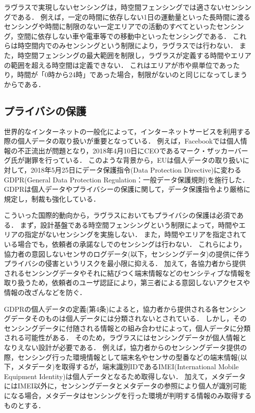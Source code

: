 ラヴラスで実現しないセンシングは，時空間フェンシングでは適さないセンシングである．
例えば，一定の時間に依存しない1日の運動量といった長時間に渡るセンシングや時間に制限のない一定エリアでの活動のすべてといったセンシング，空間に依存しない車や電車等での移動中といったセンシングである．
これらは時空間内でのみセンシングという制限により，ラヴラスでは行わない．
また，時空間フェンシングの最大範囲を制限し，ラヴラスが定義する時間やエリアの範囲を超える時空間は定義できない．
これはエリアが市や県単位であったり，時間が「0時から24時」であった場合，制限がないのと同じになってしまうからである．

\subsection{プライバシの保護}
世界的なインターネットの一般化によって，インターネットサービスを利用する際の個人データの取り扱いが重要となっている．
例えば，Facebookでは個人情報の不正流出が問題となり，2018年4月10日にCEOであるマーク・ザッカーバーグ氏が謝罪を行っている\cite{facebook}．
このような背景から，EUは個人データの取り扱いに対して，2018年5月25日にデータ保護指令(Data Protection Directive)に変わるGDPR(General Data Protection Regulation：一般データ保護規則)\cite{GDPR}を施行した．
GDPRは個人データやプライバシーの保護に関して，データ保護指令より厳格に規定し，制裁も強化している．

こういった国際的動向から，ラヴラスにおいてもプライバシの保護は必須である．
まず，設計基盤である時空間フェンシングという制限によって，時間やエリアの指定がないセンシングを実施しない．
また，時間やエリアを指定されている場合でも，依頼者の承諾なしでのセンシングは行わない．
これらにより，協力者の意図しないセンサのログデータ(以下，センシングデータ)の提供に伴うプライバシの侵害というリスクを最小限に抑える．
加えて，各協力者から提供されるセンシングデータやそれに結びつく端末情報などのセンシティブな情報を取り扱うため，依頼者のユーザ認証により，第三者による意図しないアクセスや情報の改ざんなどを防ぐ．

GDPRの個人データの定義(第4条)によると，協力者から提供される各センシングデータそのものは個人データには分類されないとされている．
しかし，そのセンシングデータに付随される情報との組み合わせによって，個人データに分類される可能性がある．
そのため，ラヴラスにはセンシングデータが個人情報となりえない設計が必要である．
例えば，協力者からのセンシングデータ提供の際，センシング行った環境情報として端末名やセンサの型番などの端末情報(以下，メタデータ)を取得するが，端末識別IDであるIMEI(International Mobile Equipment Identity)は個人データとなるため取得しない．
加えて，メタデータにはIMEI以外に，センシングデータとメタデータの参照により個人が識別可能になる場合，メタデータはセンシングを行った環境が判明する情報のみ取得するものとする．

